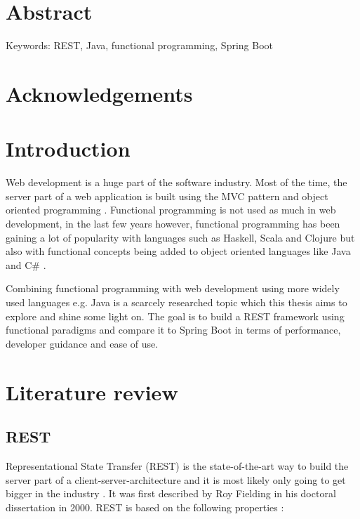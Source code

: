 \documentclass[a4paper,titlepage]{article}
\begin{document}
\newpage
\section*{Abstract}
\blindtext
\newline

\noindent Keywords: REST, Java, functional programming, Spring Boot

\newpage
\section*{Acknowledgements}
\blindtext

\newpage

\tableofcontents

\newpage

\section{Introduction}

Web development is a huge part of the software industry. Most of the time, the
server part of a web application is built using the MVC pattern and object
oriented programming \cite{damir2021architecture}. Functional programming is not
used as much in web development, in the last few years however, functional
programming has been gaining a lot of popularity with languages such as Haskell,
Scala and Clojure but also with functional concepts being added to object
oriented languages like Java and C\# \cite{klint2022functional}.\newline

\noindent Combining functional programming with web development using more
widely used languages e.g. Java is a scarcely researched topic which this thesis
aims to explore and shine some light on. The goal is to build a REST framework
using functional paradigms and compare it to Spring Boot in terms of
performance, developer guidance and ease of use.

\section{Literature review}
\subsection{REST}

Representational State Transfer (REST) is the state-of-the-art way to build the
server part of a client-server-architecture and it is most likely only going to
get bigger in the industry \cite{halili2018web}. It was first described by Roy
Fielding in his doctoral dissertation in 2000. REST is based on the following
properties \cite{fielding2000architectural}:
\end{document}

